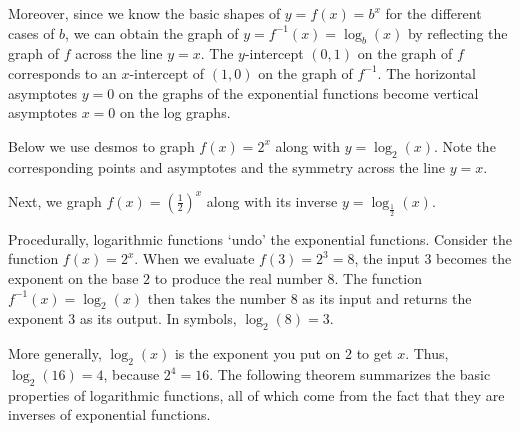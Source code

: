\documentclass{ximera}
\begin{document}
 

Moreover, since we know the basic shapes of $y = f(x) = b^{x}$ for the different cases of $b$, we can obtain the graph of $y = f^{-1}(x) = \log_{b}(x)$ by reflecting the graph of $f$ across the line $y=x$.  The $y$-intercept $(0,1)$ on the graph of $f$  corresponds to an $x$-intercept of $(1,0)$ on the graph of $f^{-1}$.  The horizontal asymptotes $y=0$ on the graphs of the exponential functions become vertical asymptotes $x=0$ on the log graphs.  

Below we use desmos to graph $f(x) = 2^{x}$ along with $y = \log_{2}(x)$.  Note the corresponding points and asymptotes and the symmetry across the line $y=x$.


\begin{center}
\end{center}

Next, we graph $f(x) = \left(\frac{1}{2}\right)^{x}$ along with its inverse $y = \log_{\frac{1}{2}}(x)$.


\begin{center}
\end{center}

Procedurally,  logarithmic functions  `undo' the exponential functions.  Consider the function $f(x) = 2^{x}$.  When we evaluate $f(3) = 2^{3} = 8$, the input $3$ becomes the exponent on the base $2$ to produce the real number $8$.  The function $f^{-1}(x) = \log_{2}(x)$ then takes the number $8$ as its input and returns the exponent $3$ as its output.  In symbols, $\log_{2}(8) = 3$. 

 

More generally, $\log_{2}(x)$ is the exponent you put on $2$ to get $x$.  Thus, $\log_{2}(16) = 4$, because $2^{4} = 16$.  The following theorem summarizes the basic properties of logarithmic functions, all of which come from the fact that they are inverses of exponential functions. 
 

\end{document}
